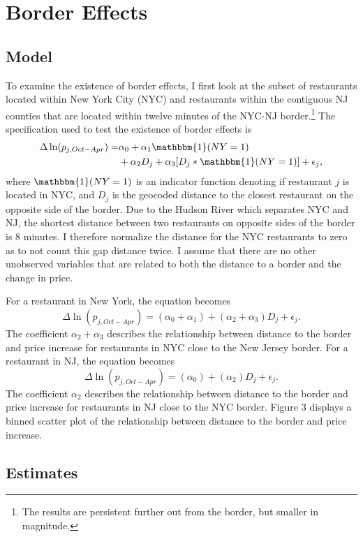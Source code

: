 \documentclass[11pt]{article}
\begin{document}
\section{Border Effects}
\subsection{Model}
 To examine the existence of border effects, I first look at the subset of restaurants located within New York City (NYC) and restaurants within the contiguous NJ counties that are located within twelve minutes of the NYC-NJ border.\footnote{The results are persistent further out from the border, but smaller in magnitude.} The specification used to test the existence of border effects is  
\begin{equation}
\begin{split}
\Delta \ln (p_{j,Oct-Apr})  = & \alpha_0 + \alpha_1  \mathbbm{1}(NY=1)  \\
& + \alpha_2 D_{j} + \alpha_3[D_j * \mathbbm{1}(NY=1)]  + \epsilon_{j}, 
\end{split}
\end{equation}
where  $\mathbbm{1}(NY=1)$ is an indicator function denoting if restaurant $j$ is located in NYC, and $D_j$ is the geocoded distance to the closest restaurant on the opposite side of the border. Due to the Hudson River which separates NYC and NJ, the shortest distance between two restaurants on opposite sides of the border is 8 minutes. I therefore normalize the distance for the NYC restaurants to zero as to not count this gap distance twice. I assume that there are no other unobserved variables that are related to both the distance to a border and the change in price. 

For a restaurant in New York, the equation becomes 
$$ \Delta \ln (p_{j,Oct-Apr})  = (\alpha_0 +\alpha_1) +  (\alpha_2 + \alpha_3) D_j  + \epsilon_{j}.   $$
The coefficient $\alpha_2 + \alpha_3$ describes the relationship between distance to the border and price increase for restaurants in NYC close to the New Jersey border. For a restaurant in NJ, the equation becomes 
$$
\Delta \ln (p_{j,Oct-Apr})  = (\alpha_0 ) +  (\alpha_2 ) D_j  + \epsilon_{j}.
$$
The coefficient $\alpha_2$ describes the relationship between distance to the border and price increase for restaurants in NJ close to the NYC border. Figure 3 displays a binned scatter plot of the relationship between distance to the border and price increase. 

\subsection{Estimates}
\end{document}
